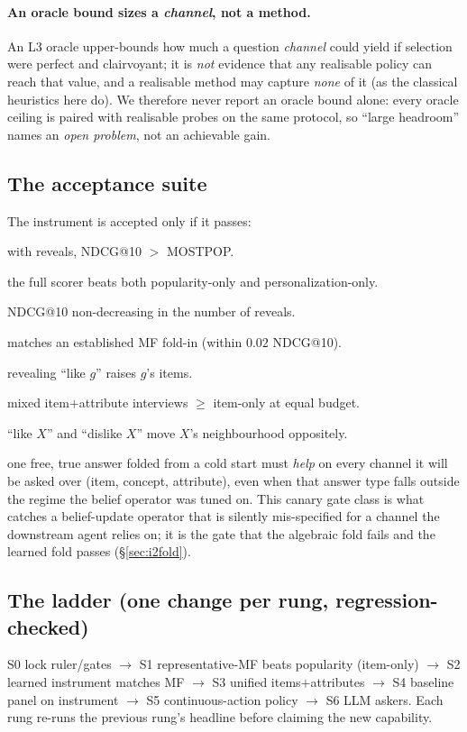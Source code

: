\documentclass[11pt]{article}
\begin{document}
\paragraph{An oracle bound sizes a \emph{channel}, not a method.} An L3 oracle upper-bounds how much a question
\emph{channel} could yield if selection were perfect and clairvoyant; it is \emph{not} evidence that any realisable
policy can reach that value, and a realisable method may capture \emph{none} of it (as the classical heuristics here
do). We therefore never report an oracle bound alone: every oracle ceiling is paired with realisable probes on the same
protocol, so ``large headroom'' names an \emph{open problem}, not an achievable gain.

\subsection{The acceptance suite}
The instrument is accepted only if it passes:
\begin{description}[leftmargin=2.2em,itemsep=1pt]
  \item[G1 beats-popularity] with reveals, NDCG@10 $>$ MOSTPOP.
  \item[G2 floor$+$residual law] the full scorer beats both popularity-only and personalization-only.
  \item[G3 monotonicity] NDCG@10 non-decreasing in the number of reveals.
  \item[G4 $\ge$MF] matches an established MF fold-in (within $0.02$ NDCG@10).
  \item[G5 attribute directionality] revealing ``like $g$'' raises $g$'s items.
  \item[G6 attribute value] mixed item$+$attribute interviews $\ge$ item-only at equal budget.
  \item[G7 polarity] ``like $X$'' and ``dislike $X$'' move $X$'s neighbourhood oppositely.
  \item[G8 out-of-envelope canary] one free, true answer folded from a cold start must \emph{help} on every
  channel it will be asked over (item, concept, attribute), even when that answer type falls outside the
  regime the belief operator was tuned on. This canary gate class is what catches a belief-update operator
  that is silently mis-specified for a channel the downstream agent relies on; it is the gate that the
  algebraic fold fails and the learned fold passes (\S\ref{sec:i2fold}).
\end{description}

\subsection{The ladder (one change per rung, regression-checked)}
S0 lock ruler/gates $\to$ S1 representative-MF beats popularity (item-only) $\to$ S2 learned instrument matches MF
$\to$ S3 unified items$+$attributes $\to$ S4 baseline panel on instrument $\to$ S5 continuous-action policy $\to$
S6 LLM askers. Each rung re-runs the previous rung's headline before claiming the new capability.
\end{document}
